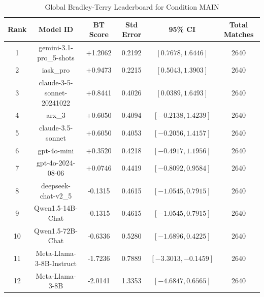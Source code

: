 \begin{table}[ht]
\centering
\caption{Global Bradley-Terry Leaderboard for Condition \textsc{MAIN}}
\label{tab:leaderboard_main}
\begin{tabular}{cccccc}
\hline
\textbf{Rank} & \textbf{Model ID} & \textbf{BT Score} & \textbf{Std Error} & \textbf{95\% CI} & \textbf{Total Matches} \\
\hline
1 & gemini-3.1-pro\_5-shots & +1.2062 & 0.2192 & $[0.7678, 1.6446]$ & 2640 \\
2 & iask\_pro & +0.9473 & 0.2215 & $[0.5043, 1.3903]$ & 2640 \\
3 & claude-3-5-sonnet-20241022 & +0.8441 & 0.4026 & $[0.0389, 1.6493]$ & 2640 \\
4 & arx\_3 & +0.6050 & 0.4094 & $[-0.2138, 1.4239]$ & 2640 \\
5 & claude-3.5-sonnet & +0.6050 & 0.4053 & $[-0.2056, 1.4157]$ & 2640 \\
6 & gpt-4o-mini & +0.3520 & 0.4218 & $[-0.4917, 1.1956]$ & 2640 \\
7 & gpt-4o-2024-08-06 & +0.0746 & 0.4419 & $[-0.8092, 0.9584]$ & 2640 \\
8 & deepseek-chat-v2\_5 & -0.1315 & 0.4615 & $[-1.0545, 0.7915]$ & 2640 \\
9 & Qwen1.5-14B-Chat & -0.1315 & 0.4615 & $[-1.0545, 0.7915]$ & 2640 \\
10 & Qwen1.5-72B-Chat & -0.6336 & 0.5280 & $[-1.6896, 0.4225]$ & 2640 \\
11 & Meta-Llama-3-8B-Instruct & -1.7236 & 0.7889 & $[-3.3013, -0.1459]$ & 2640 \\
12 & Meta-Llama-3-8B & -2.0141 & 1.3353 & $[-4.6847, 0.6565]$ & 2640 \\
\hline
\end{tabular}
\end{table}
